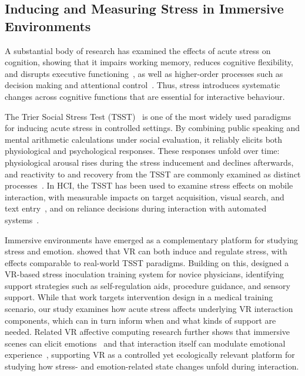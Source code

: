 \subsection{Inducing and Measuring Stress in Immersive Environments}
A substantial body of research has examined the effects of acute stress on cognition, showing that it impairs working memory, reduces cognitive flexibility, and disrupts executive functioning~\citep{arnsten2009stress,starcke2016effects}, as well as higher-order processes such as decision making and attentional control~\citep{qin2009acute, starcke2012decision}. Thus, stress introduces systematic changes across cognitive functions that are essential for interactive behaviour.

The Trier Social Stress Test (TSST)~\citep{kirschbaum1993trier} is one of the most widely used paradigms for inducing acute stress in controlled settings. By combining public speaking and mental arithmetic calculations under social evaluation, it reliably elicits both physiological and psychological responses. These responses unfold over time: physiological arousal rises during the stress inducement and declines afterwards, and reactivity to and recovery from the TSST are commonly examined as distinct processes~\citep{linden1997physiological,chida2008chronic}. In HCI, the TSST has been used to examine stress effects on mobile interaction, with measurable impacts on target acquisition, visual search, and text entry~\citep{sarsenbayeva2019measuring}, and on reliance decisions during interaction with automated systems~\citep{mcguire2023stress}.

Immersive environments have emerged as a complementary platform for studying stress and emotion. \citet{liszio2018relaxing, liszio2019interactive} showed that VR can both induce and regulate stress, with effects comparable to real-world TSST paradigms. Building on this, \citet{zhang2026seconds} designed a VR-based stress inoculation training system for novice physicians, identifying support strategies such as self-regulation aids, procedure guidance, and sensory support. While that work targets intervention design in a medical training scenario, our study examines how acute stress affects underlying VR interaction components, which can in turn inform when and what kinds of support are needed. Related VR affective computing research further shows that immersive scenes can elicit emotions~\citep{jiang2024immersive} and that interaction itself can modulate emotional experience~\citep{kuang2026understanding}, supporting VR as a controlled yet ecologically relevant platform for studying how stress- and emotion-related state changes unfold during interaction.

